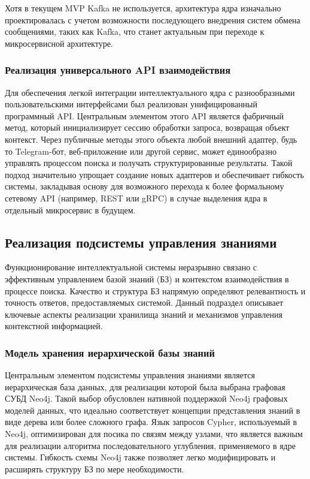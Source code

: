 Хотя в текущем MVP Kafka не используется, архитектура ядра изначально проектировалась с учетом возможности последующего внедрения систем обмена сообщениями, таких как Kafka, что станет актуальным при переходе к микросервисной архитектуре.

\subsubsection{Реализация универсального API взаимодействия}

Для обеспечения легкой интеграции интеллектуального ядра с разнообразными пользовательскими интерфейсами был реализован унифицированный программный API. Центральным элементом этого API является фабричный метод, который инициализирует сессию обработки запроса, возвращая объект контекст. Через публичные методы этого объекта любой внешний адаптер, будь то Telegram-бот, веб-приложение или другой сервис, может единообразно управлять процессом  поиска и получать структурированные результаты. Такой подход значительно упрощает создание новых адаптеров и обеспечивает гибкость системы, закладывая основу для возможного перехода к более формальному сетевому API (например, REST или gRPC) в случае выделения ядра в отдельный микросервис в будущем.

\subsection{Реализация подсистемы управления знаниями}

Функционирование интеллектуальной системы неразрывно связано с эффективным управлением базой знаний (БЗ) и контекстом взаимодействия в процессе поиска. Качество и структура БЗ напрямую определяют релевантность и точность ответов, предоставляемых системой. Данный подраздел описывает ключевые аспекты реализации хранилища знаний и механизмов управления контекстной информацией.

\subsubsection{Модель хранения иерархической базы знаний}

Центральным элементом подсистемы управления знаниями является иерархическая база данных, для реализации которой была выбрана графовая СУБД Neo4j. Такой выбор обусловлен нативной поддержкой Neo4j графовых моделей данных, что идеально соответствует концепции представления знаний в виде дерева или более сложного графа. Язык запросов Cypher\cite{cypher}, используемый в Neo4j, оптимизирован для посика по связям между узлами, что является важным для реализации алгоритма последовательного углубления, применяемого в ядре системы. Гибкость схемы Neo4j также позволяет легко модифицировать и расширять структуру БЗ по мере необходимости.

